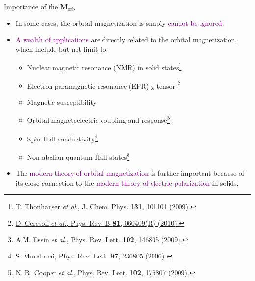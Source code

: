 \documentclass{beamer}
\newcommand{\purple}{\textcolor{purple}}
\begin{document}
    \begin{frame}{Importance of the \(\bm{M}_{\text{orb}}\)}
    \begin{block}{}
      \begin{itemize}
        \item In some cases, the orbital magnetization is simply \purple{cannot be ignored}.
        \item \purple{A wealth of applications} are directly related to the orbital magnetization, which include but not limit to:
        \begin{itemize}
          \item Nuclear magnetic resonance (NMR) in solid states\footnote{\tiny \href{https://doi.org/10.1063/1.3216028}{T. Thonhauser \emph{et al.}, J. Chem. Phys. \textbf{131}, 101101 (2009).}}
          \item Electron paramagnetic resonance (EPR) g-tensor \footnote{\tiny \href{https://doi.org/10.1103/PhysRevB.81.060409}{D. Ceresoli \emph{et al.}, Phys. Rev. B \textbf{81}, 060409(R) (2010).}}
          \item Magnetic susceptibility
          \item Orbital magnetoelectric coupling and response\footnote{\tiny \href{https://doi.org/10.1103/PhysRevLett.102.146805}{A.M. Essin \emph{et al.}, Phys. Rev. Lett. \textbf{102}, 146805 (2009).}}
          \item Spin Hall conductivity\footnote{\tiny \href{https://doi.org/10.1103/PhysRevLett.97.236805}{S. Murakami, Phys. Rev. Lett. \textbf{97}, 236805 (2006).}}
          \item Non-abelian quantum Hall states\footnote{\tiny \href{https://doi.org/10.1103/PhysRevLett.102.176807}{N. R. Cooper \emph{et al.}, Phys. Rev. Lett. \textbf{102}, 176807 (2009).}}
        \end{itemize}
        \item The \purple{modern theory of orbital magnetization} is further important because of its close connection to the \purple{modern theory of electric polarization} in solids.
      \end{itemize}
    \end{block}
    \end{frame}
\end{document}
